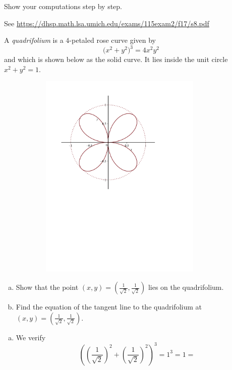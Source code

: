 \documentclass[11pt]{exam}
\begin{document}
\begin{questions}
\begin{multicols}{2}
\begin{enumerate}[(a)]
Show your computations step by step.
	\end{enumerate}
	\end{multicols}
        \begin{solution}
          See \href{https://dhsp.math.lsa.umich.edu/exams/115exam2/f17/s8.pdf}{https://dhsp.math.lsa.umich.edu/exams/115exam2/f17/s8.pdf}
        \end{solution}
\question A {\it quadrifolium} is a $4$-petaled rose curve given by
\begin{equation*}
	\big(x^2+y^2\big)^3=4x^2y^2
\end{equation*}
and which is shown below as the solid curve. It lies inside the unit
circle $x^2+y^2=1$.
\begin{figure}[h]
\centering
\includegraphics[width=10cm,height=10cm]{Figures/fig3.pdf}
\end{figure}
\begin{enumerate}[(a)]
	\item Show that the point $(x,y)=(\frac{1}{\sqrt{2}},\frac{1}{\sqrt{2}})$ lies on the quadrifolium.
	\item Find the equation of the tangent line to the quadrifolium at $(x,y)=(\frac{1}{\sqrt{2}},\frac{1}{\sqrt{2}})$.
\end{enumerate}
\begin{solution}
  \begin{enumerate}[(a)]
  \item We verify \[
      \left(\left(\frac{1}{\sqrt{2}}\right)^2+\left(\frac{1}{\sqrt{2}}\right)^2\right)^3 = 1^3 = 1 =
\]
\end{enumerate}
\end{solution}
\end{questions}
\end{document}
